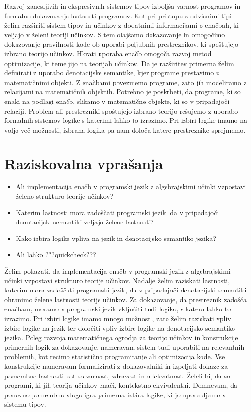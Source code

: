 \documentclass{article}
\begin{document}
Razvoj zanesljivih in ekspresivnih sistemov tipov izboljša varnost programov in  formalno dokazovanje lastnosti programov. Kot pri pristopu z odvisnimi tipi~\cite{DBLP:journals/pacmpl/Ahman18} želim razširiti sistem tipov in učinkov z dodatnimi informacijami o enačbah, ki veljajo v želeni teoriji učinkov. S tem olajšamo dokazovanje in omogočimo dokazovanje pravilnosti kode ob uporabi poljubnih prestreznikov, ki spoštujejo izbrano teorijo učinkov. Hkrati uporaba enačb omogoča razvoj metod optimizacije, ki temeljijo na teorijah učinkov. Da je razširitev primerna želim definirati z uporabo denotacijske semantike, kjer programe prestavimo z matematičnimi objekti. Z enačbami povezujemo programe, zato jih modeliramo z relacijami na matematičnih objektih. Potrebno je poskrbeti, da programe, ki so enaki na podlagi enačb, slikamo v matematične objekte, ki so v pripadajoči relaciji. Problem ali prestrezniki spoštujejo izbrano teorijo rešujemo z uporabo formalnih sistemov logike s katerimi lahko to izrazimo. Pri izbiri logike imamo na voljo več možnosti, izbrana logika pa nam določa katere prestreznike sprejmemo. 

\section*{Raziskovalna vprašanja}

\begin{itemize}
  \item Ali implementacija enačb v programski jezik z algebrajskimi učinki vzpostavi želeno strukturo teorije učinkov?
  \item Katerim lastnosti mora zadoščati programski jezik, da v pripadajoči denotacijski semantiki veljajo želene lastnosti?
  \item Kako izbira logike vpliva na jezik in denotacijsko semantiko jezika?
  \item Ali lahko ???quickcheck???
\end{itemize}

Želim pokazati, da implementacija enačb v programski jezik z algebrajskimi učinki vzpostavi strukturo teorije učinkov. Nadalje želim raziskati lastnosti, katerim mora zadoščati programski jezik, da v pripadajoči denotacijski semantiki ohranimo želene lastnosti teorije učinkov. Za dokazovanje, da prestreznik zadošča enačbam, moramo v programski jezik vključiti tudi logiko, s katero lahko to izrazimo. Pri izbiri logike imamo mnogo možnosti, zato želim raziskati vpliv izbire logike na jezik ter določiti vpliv izbire logike na denotacijsko semantiko jezika. Poleg razvoja matematičnega ogrodja za teorijo učinkov in konstrukcije primernih logik za dokazovanje, nameravam sistem tudi uporabiti na relevantnih problemih, kot recimo statistično programiranje ali optimizacija kode. Vse konstrukcije nameravam formalizirati z dokazovalniki in izpeljati dokaze za pomembne lastnosti kot so varnost, zdravost in adekvatnost. Želeli bi, da so programi, ki jih teorija učinkov enači, kontekstno ekvivalentni. Domnevam, da ponovno pomembno vlogo igra primerna izbira logike, ki jo uporabljamo v sistemu tipov. 
\end{document}
